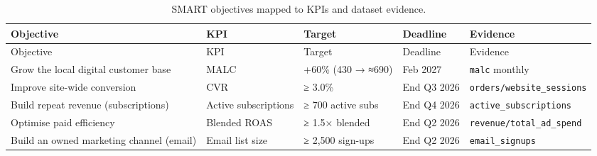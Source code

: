 \documentclass[
  11pt,
]{article}
\begin{document}
\begin{longtable}[]{@{}
  >{\raggedright\arraybackslash}p{}
  >{\raggedright\arraybackslash}p{}
  >{\raggedright\arraybackslash}p{}
  >{\raggedright\arraybackslash}p{}
  >{\raggedright\arraybackslash}p{}@{}}
\caption{SMART objectives mapped to KPIs and dataset
evidence.}\tabularnewline
\toprule\noalign{}
\begin{minipage}[b]{\linewidth}\raggedright
Objective
\end{minipage} & \begin{minipage}[b]{\linewidth}\raggedright
KPI
\end{minipage} & \begin{minipage}[b]{\linewidth}\raggedright
Target
\end{minipage} & \begin{minipage}[b]{\linewidth}\raggedright
Deadline
\end{minipage} & \begin{minipage}[b]{\linewidth}\raggedright
Evidence
\end{minipage} \\
\midrule\noalign{}
\endfirsthead
\toprule\noalign{}
\begin{minipage}[b]{\linewidth}\raggedright
Objective
\end{minipage} & \begin{minipage}[b]{\linewidth}\raggedright
KPI
\end{minipage} & \begin{minipage}[b]{\linewidth}\raggedright
Target
\end{minipage} & \begin{minipage}[b]{\linewidth}\raggedright
Deadline
\end{minipage} & \begin{minipage}[b]{\linewidth}\raggedright
Evidence
\end{minipage} \\
\midrule\noalign{}
\endhead
\bottomrule\noalign{}
\endlastfoot
Grow the local digital customer base & MALC & +60\% (430 → ≈690) & Feb
2027 & \texttt{malc} monthly \\
Improve site-wide conversion & CVR & ≥ 3.0\% & End Q3 2026 &
\texttt{orders/website\_sessions} \\
Build repeat revenue (subscriptions) & Active subscriptions & ≥ 700
active subs & End Q4 2026 & \texttt{active\_subscriptions} \\
Optimise paid efficiency & Blended ROAS & ≥ 1.5× blended & End Q2 2026 &
\texttt{revenue/total\_ad\_spend} \\
Build an owned marketing channel (email) & Email list size & ≥ 2,500
sign-ups & End Q2 2026 & \texttt{email\_signups} \\
\end{longtable}
\end{document}
